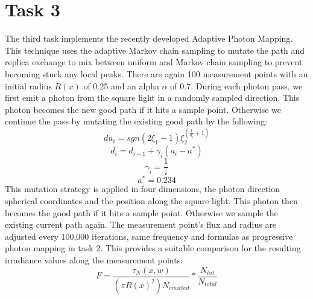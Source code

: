 \section*{Task 3}
The third task implements the recently developed Adaptive Photon Mapping. This technique uses the adaptive Markov chain sampling to mutate the path and replica exchange to mix between uniform and Markov chain sampling to prevent becoming stuck any local peaks. There are again 100 measurement points with an initial radius $ R(x) $ of 0.25 and an alpha $ \alpha $ of 0.7.
During each photon pass, we first emit a photon from the square light in a randomly sampled direction. This photon becomes the new good path if it hits a sample point. Otherwise we continue the pass by mutating the existing good path by the following:
$$du_i = sgn(2\xi_1 - 1)\xi_2^{(\frac{1}{d_i}+1)}$$
$$d_i = d_{i-1} + \gamma_i(a_i - a^*)$$
$$\gamma_i = \frac{1}{i}$$
$$a^* = 0.234$$
This mutation strategy is applied in four dimensions, the photon direction spherical coordinates and the position along the square light. This photon then becomes the good path if it hits a sample point. Otherwise we sample the existing current path again. The measurement point's flux and radius are adjusted every 100,000 iterations, same frequency and formulas as progressive photon mapping in task 2. This provides a suitable comparison for the resulting irradiance values along the measurement points:
$$ F = \frac{\tau_{N}(x, w)}{(\pi R(x)^2) N_{emitted}}*\frac{N_{hit}}{N_{total}} $$
